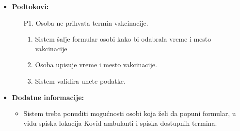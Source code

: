\documentclass[titlepage]{article}
\begin{document}
\begin{itemize}
\begin{enumerate}
    \end{enumerate}
    \item \textbf{Podtokovi:}
    \begin{itemize}
        \item[P1.] Osoba ne prihvata termin vakcinacije. 
        \begin{enumerate}
        \item Sistem šalje formular osobi kako bi odabrala vreme i mesto vakcinacije
        \item Osoba upisuje vreme i mesto vakcinacije.
        \item Sistem validira unete podatke.
        \end{enumerate}
    \end{itemize}
    \item \textbf{Dodatne informacije:}
    \begin{itemize}
        \item Sistem treba ponuditi mogućnosti osobi koja želi da popuni formular, u vidu spiska lokacija Kovid-ambulanti i spiska dostupnih termina.
    \end{itemize}
\end{itemize}
\end{document}
